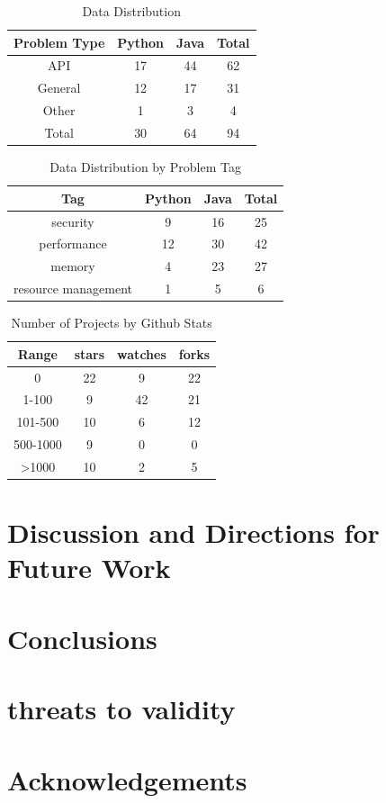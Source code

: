 \documentclass[sigconf]{acmart}
\begin{document}
\begin{table}
  \caption{Data Distribution}
  \label{tab:type}
\begin{tabular}{  c c c c}
\toprule
  Problem Type&	Python&Java & Total\\
 \midrule
 API &			17  &  44 &   62\\
 General &		12   &  17 &  31\\
 Other &		1   &  3  &   4\\
 \midrule
  Total&		30 &  64 &   94\\
\bottomrule
\end{tabular}
\end{table}

\begin{table}
  \caption{Data Distribution by Problem Tag}
  \label{tab:tag}
\begin{tabular}{  c c c c }
\toprule
  Tag & Python&Java & Total\\
 \midrule
security&9 &16 & 25\\
performance&12 &30&42 \\
memory&4 &23 & 27 \\
resource management&1 &5&6 \\


\bottomrule
\end{tabular}
\end{table}

\begin{table}
  \caption{Number of Projects by Github Stats}
  \label{tab:domain}
\begin{tabular}{  c c c c }
\toprule
  Range & stars & watches & forks\\
 \midrule
0&		 22 &9& 22\\
1-100&   9 &42& 21\\
101-500& 10 &6 &12\\
500-1000&9 &0 &0\\
>1000   & 10 & 2&5\\

\bottomrule
\end{tabular}
\end{table}

\section{Discussion and Directions for Future Work}
\section{Conclusions}
\section*{threats to validity}


\section*{Acknowledgements}




\end{document}
